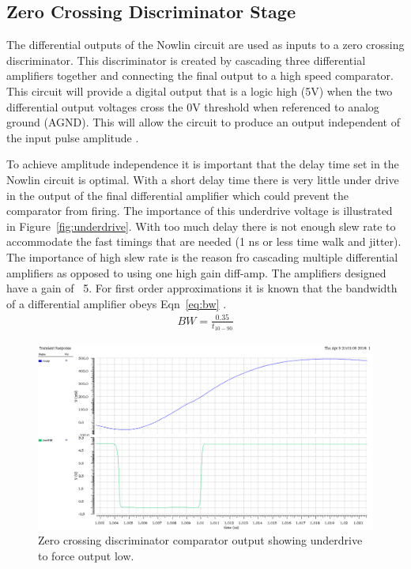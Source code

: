 \documentclass[12pt,oneside,final]{siuethesis}
\theoremstyle{definition}
\begin{document}
\subsection{Zero Crossing Discriminator Stage}
\par The differential outputs of the Nowlin circuit are used as inputs to a zero crossing discriminator. This discriminator is created by cascading three differential amplifiers together and connecting the final output to a high speed comparator. This circuit will provide a digital output that is a logic high (5V) when the two differential output voltages cross the 0V threshold when referenced to analog ground (AGND). This will allow the circuit to produce an output independent of the input pulse amplitude \cite{CFD}. 
\par To achieve amplitude independence it is important that the delay time set in the Nowlin circuit is optimal. With a short delay time there is very little under drive in the output of the final differential amplifier which could prevent the comparator from firing. The importance of this underdrive voltage is illustrated in Figure~\ref{fig:underdrive}. With too much delay there is not enough slew rate to accommodate the fast timings that are needed (1 ns or less time walk and jitter). The importance of high slew rate is the reason fro cascading multiple differential amplifiers as opposed to using one high gain diff-amp. The amplifiers designed have a gain of ~5. For first order approximations it is known that the bandwidth of a differential amplifier obeys Eqn~\ref{eq:bw} \cite{CFD}.
\begin{eqnarray}
BW = \frac{0.35}{t_{10-90}}
\label{eq:bw}
\end{eqnarray}
\begin{figure}[ht]
\centering
\includegraphics[scale=.4,keepaspectratio=true]{images/zcd_out.png} 
\caption{Zero crossing discriminator comparator output showing underdrive to force output low.}
\label{fig:ZCD}
\end{figure}
\end{document}
